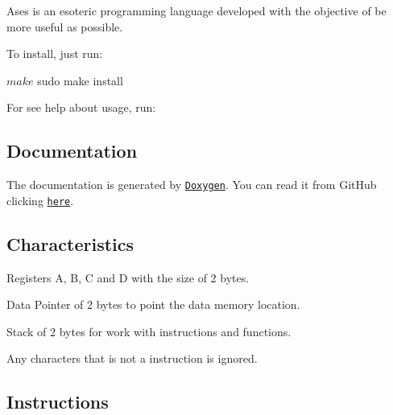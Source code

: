 Ases is an esoteric programming language developed with the objective of be more useful as possible.

To install, just run\+: 
\begin{DoxyCode}
$ make
$ sudo make install
\end{DoxyCode}


For see help about usage, run\+: 


\subsection*{Documentation}

The documentation is generated by \href{https://www.doxygen.org/index.html}{\tt Doxygen}. You can read it from Git\+Hub clicking \href{docs/html/index.html}{\tt here}.

\subsection*{Characteristics}


\begin{DoxyItemize}
\item Registers A, B, C and D with the size of 2 bytes.
\item Data Pointer of 2 bytes to point the data memory location.
\item Stack of 2 bytes for work with instructions and functions.
\item Any characters that is not a instruction is ignored.
\end{DoxyItemize}

\subsection*{Instructions}

